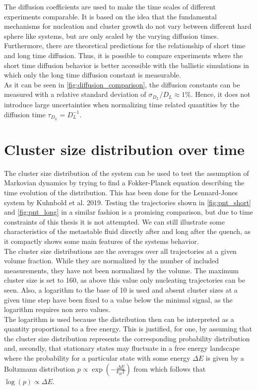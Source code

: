 The diffusion coefficients are used to make the time scales of different experiments comparable. It is based on the idea that the fundamental mechanisms for nucleation and cluster growth do not vary between different hard sphere like systems, but are only scaled by the varying diffusion times. Furthermore, there are theoretical predictions for the relationship of short time and long time diffusion. Thus, it is possible to compare experiments where the short time diffusion behavior is better accessible with the ballistic simulations in which only the long time diffusion constant is measurable.\\

As it can be seen in \autoref{fig:diffusion_comparison}, the diffusion constants can be measured with a relative standard deviation of $\sigma_{D_L}/D_L \approx 1\%$. Hence, it does not introduce large uncertainties when normalizing time related quantities by the diffusion time $\tau_{D_L} = D_L^{-1}$.

\section{Cluster size distribution over time}
\label{sec:pnt}
The cluster size distribution of the system can be used to test the assumption of Markovian dynamics by trying to find a Fokker-Planck equation describing the time evolution of the distribution. This has been done for the Lennard-Jones system by Kuhnbold et al. 2019\cite{Kuhnbold2019}. Testing the trajectories shown in \autoref{fig:pnt_short} and \autoref{fig:pnt_long} in a similar fashion is a promising comparison, but due to time constraints of this thesis it is not attempted. We can still illustrate some characteristics of the metastable fluid directly after and long after the quench, as it compactly shows some main features of the systems behavior.\\ 

The cluster size distributions are the averages over all trajectories at a given volume fraction. While they are normalized by the number of included measurements, they have not been normalized by the volume. The maximum cluster size is set to 160, as above this value only nucleating trajectories can be seen. Also, a logarithm to the base of 10 is used and absent cluster sizes at a given time step have been fixed to a value below the minimal signal, as the logarithm requires non zero values.\\

The logarithm is used because the distribution then can be interpreted as a quantity proportional to a free energy. This is justified, for one, by assuming that the cluster size distribution represents the corresponding probability distribution and, secondly, that stationary states may fluctuate in a free energy landscape where the probability for a particular state with some energy $\Delta E$ is given by a Boltzmann distribution $p\propto \exp \left( - \frac{\Delta E}{k_B T} \right)$ from which follows that $\log(p) \propto \Delta E$.\\

